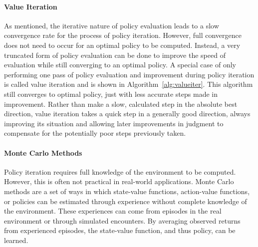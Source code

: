 

\paragraph*{Value Iteration}

As mentioned,
the iterative nature of policy evaluation leads to a slow convergence rate
for the process of policy iteration.
%
However,
full convergence does not need to occur for an optimal policy to be computed.
%
Instead,
a very truncated form of policy evaluation can be done to improve the speed
of evaluation while still converging to an optimal policy.
%
A special case of only performing one pass of policy evaluation and improvement
during policy iteration is called value iteration
and is shown in Algorithm~\ref{alg:valueiter}. 
%
This algorithm still converges to optimal policy,
just with less accurate steps made in improvement.
%
Rather than make a slow, calculated step in the absolute best direction,
value iteration takes a quick step in a generally good direction,
always improving its situation and
allowing later improvements in judgment to compensate for the potentially poor
steps previously taken.



\paragraph*{Monte Carlo Methods}


Policy iteration requires full knowledge of the environment to be computed.
%
However,
this is often not practical in real-world applications.
%
Monte Carlo methods are a set of ways in which
state-value functions, action-value functions, or policies can be estimated through experience without
complete knowledge of the environment.
%
These experiences can come from episodes in the real environment
or through simulated encounters.
%
By averaging observed returns from experienced episodes,
the state-value function,
and thus policy,
can be learned.

